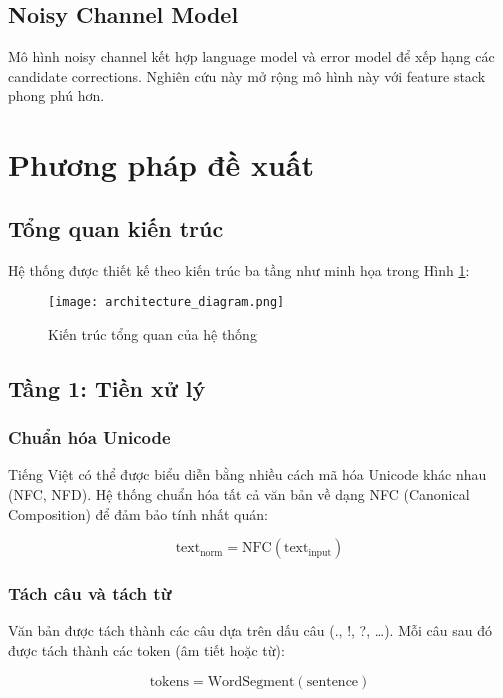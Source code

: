 \documentclass[conference]{IEEEtran}
\begin{document}
\subsection{Noisy Channel Model}
Mô hình noisy channel \cite{kernighan1990spelling} kết hợp language model và error model để xếp hạng các candidate corrections. Nghiên cứu này mở rộng mô hình này với feature stack phong phú hơn.

\section{Phương pháp đề xuất}

\subsection{Tổng quan kiến trúc}
Hệ thống được thiết kế theo kiến trúc ba tầng như minh họa trong Hình \ref{fig:architecture}:

\begin{figure}[htbp]
\centering
\texttt{[image: architecture\_diagram.png]}
\caption{Kiến trúc tổng quan của hệ thống}
\label{fig:architecture}
\end{figure}


\subsection{Tầng 1: Tiền xử lý}

\subsubsection{Chuẩn hóa Unicode}
Tiếng Việt có thể được biểu diễn bằng nhiều cách mã hóa Unicode khác nhau (NFC, NFD). Hệ thống chuẩn hóa tất cả văn bản về dạng NFC (Canonical Composition) để đảm bảo tính nhất quán:

\begin{equation}
\text{text}_{\text{norm}} = \text{NFC}(\text{text}_{\text{input}})
\end{equation}

\subsubsection{Tách câu và tách từ}
Văn bản được tách thành các câu dựa trên dấu câu (., !, ?, …). Mỗi câu sau đó được tách thành các token (âm tiết hoặc từ):

\begin{equation}
\text{tokens} = \text{WordSegment}(\text{sentence})
\end{equation}
\end{document}
